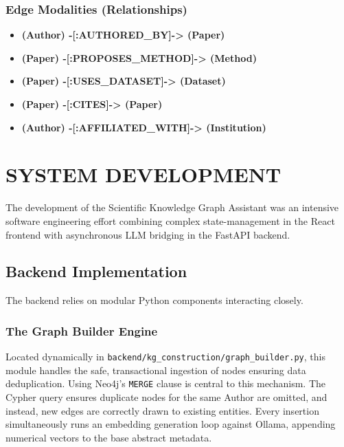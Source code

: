 \documentclass[12pt,a4paper]{report}
\begin{document}
\subsection{Edge Modalities (Relationships)}
\begin{itemize}
    \item \textbf{(Author) -[:AUTHORED\_BY]-> (Paper)}
    \item \textbf{(Paper) -[:PROPOSES\_METHOD]-> (Method)}
    \item \textbf{(Paper) -[:USES\_DATASET]-> (Dataset)}
    \item \textbf{(Paper) -[:CITES]-> (Paper)}
    \item \textbf{(Author) -[:AFFILIATED\_WITH]-> (Institution)}
\end{itemize}

\chapter{SYSTEM DEVELOPMENT}
\noindent{\rule{\textwidth}{1.5pt}}

The development of the Scientific Knowledge Graph Assistant was an intensive software engineering effort combining complex state-management in the React frontend with asynchronous LLM bridging in the FastAPI backend.

\section{Backend Implementation}
The backend relies on modular Python components interacting closely.

\subsection{The Graph Builder Engine}
Located dynamically in \texttt{backend/kg\_construction/graph\_builder.py}, this module handles the safe, transactional ingestion of nodes ensuring data deduplication. Using Neo4j's \texttt{MERGE} clause is central to this mechanism. The Cypher query ensures duplicate nodes for the same Author are omitted, and instead, new edges are correctly drawn to existing entities. Every insertion simultaneously runs an embedding generation loop against Ollama, appending numerical vectors to the base abstract metadata.
\end{document}
